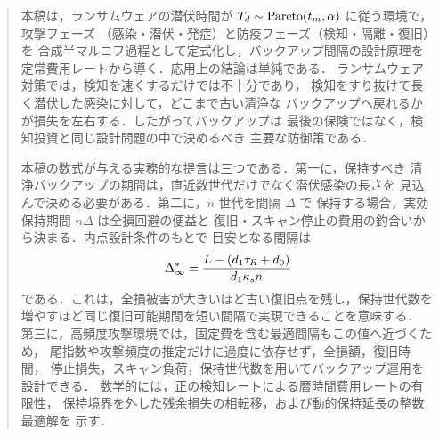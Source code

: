 \begin{abstract}
本稿は，ランサムウェアの潜伏時間が
$T_d\sim\Pareto(t_m,\alpha)$ に従う環境で，攻撃フェーズ
（感染・潜伏・発症）と防疫フェーズ（検知・隔離・復旧）を
合成半マルコフ過程として定式化し，バックアップ間隔の設計原理を
定常費用レートから導く．応用上の結論は単純である．
ランサムウェア対策では，検知を速くするだけでは不十分であり，
検知をすり抜けて長く潜伏した感染に対して，どこまで古い清浄な
バックアップへ戻れるかが損失を左右する．したがってバックアップは
最後の保険ではなく，検知投資と同じ設計問題の中で決めるべき
主要な防御策である．

本稿の数式が与える実務的な提言は三つである．第一に，保持すべき
清浄バックアップの期間は，直近数世代だけでなく潜伏感染の長さを
見込んで決める必要がある．第二に，$n$ 世代を間隔 $\Delta$ で
保持する場合，実効保持期間 $n\Delta$ は全損回避の便益と
復旧・スキャン停止の費用の釣合いから決まる．内点設計条件のもとで
目安となる間隔は
\[
  \Dstar=\frac{L-(d_1\tau_R+d_0)}{d_1\kappa_s n}
\]
である．これは，全損被害が大きいほど古い復旧点を残し，保持世代数を
増やすほど同じ復旧可能期間を短い間隔で実現できることを意味する．
第三に，高頻度攻撃環境では，固定費を含む最適間隔もこの値へ近づくため，
尾指数や攻撃頻度の推定だけに過度に依存せず，全損額，復旧時間，
停止損失，スキャン負荷，保持世代数を用いてバックアップ運用を設計できる．
数学的には，正の検知レートによる暦時間費用レートの有限性，
保持境界を外した残余損失の相転移，および動的保持延長の整数最適解を
示す．
\end{abstract}
